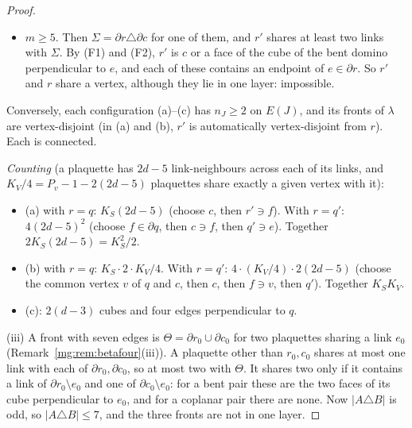 \documentclass[11pt,a4paper]{article}
\theoremstyle{definition}
\theoremstyle{remark}
\begin{document}
\begin{proof}
\begin{itemize}
\begin{itemize}
perpendicular to $q$.
\item Hence each plaquette of $P$ contains one link of each pair. A plaquette containing a link of $q$ and one of $q'$ is a face of $\Gamma$ between them.
\item For a skew hexagon, each such face also contains a link of $\Sigma\cap(\partial q\cup\partial q')$ (F2), hence only two links of $A\triangle B$: impossible.
\item For a bent domino, the faces $c_1,c_2$ have no link in $\partial q\setminus\Sigma$, so $P$ is the set of the two remaining faces: case (c). These share the edge of $\Gamma$ opposite to
$e$, which lies outside $A\cup B$, as (b) allows.
\end{itemize}
\item $m\ge5$. Then $\Sigma=\partial r\triangle\partial c$ for one of them, and $r'$ shares at least two links with $\Sigma$. By (F1) and (F2), $r'$ is $c$ or a face of the cube of the bent
domino perpendicular to $e$, and each of these contains an endpoint of $e\in\partial r$. So $r'$ and $r$ share a vertex, although they lie in one layer: impossible.
\end{itemize}
Conversely, each configuration (a)--(c) has $n_J\ge2$ on $E(J)$, and its fronts of $\lambda$ are vertex-disjoint (in (a) and (b), $r'$ is automatically vertex-disjoint from $r$). Each is
connected.

\emph{Counting} (a plaquette has $2d-5$ link-neighbours across each of its links, and $K_V/4=P_v-1-2(2d-5)$ plaquettes share exactly a given vertex with it):
\begin{itemize}
\item (a) with $r=q$: $K_S(2d-5)$ (choose $c$, then $r'\ni f$). With $r=q'$: $4(2d-5)^2$ (choose $f\in\partial q$, then $c\ni f$, then $q'\ni e$). Together $2K_S(2d-5)=K_S^2/2$.
\item (b) with $r=q$: $K_S\cdot2\cdot K_V/4$. With $r=q'$: $4\cdot(K_V/4)\cdot2(2d-5)$ (choose the common vertex $v$ of $q$ and $c$, then $c$, then $f\ni v$, then $q'$). Together $K_SK_V$.
\item (c): $2(d-3)$ cubes and four edges perpendicular to $q$.
\end{itemize}

(iii) A front with seven edges is $\Theta=\partial r_0\cup\partial c_0$ for two plaquettes sharing a link $e_0$ (Remark~\ref{mg:rem:betafour}(iii)). A plaquette other than $r_0,c_0$
shares at most one link with each of $\partial r_0,\partial c_0$, so at most two with $\Theta$. It shares two only if it contains a link of $\partial r_0\setminus e_0$ and one of
$\partial c_0\setminus e_0$: for a bent pair these are the two faces of its cube perpendicular to $e_0$, and for a coplanar pair there are none. Now $|A\triangle B|$ is odd, so
$|A\triangle B|\le7$, and the three fronts are not in one layer.


\end{proof}
\end{document}
